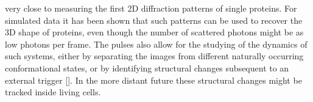 \DIFdelbegin {}\DIFdelend \DIFaddbegin {}\DIFaddend very close to measuring the first 2D diffraction
patterns of single proteins. For simulated data it has been shown that
such patterns can be used to recover the 3D shape of proteins, even
though the number of scattered photons might be as low \DIFdelbegin {}\DIFdelend \DIFaddbegin {} photons
per frame. The \DIFdelbegin {}\DIFdelend \DIFaddbegin {}\DIFaddend pulses also allow for the studying of the
dynamics of such systems, either by separating the images from
different naturally occurring conformational states, or by identifying
structural changes subsequent to an external trigger []. In the more
distant future these structural changes might be tracked inside living
cells.
